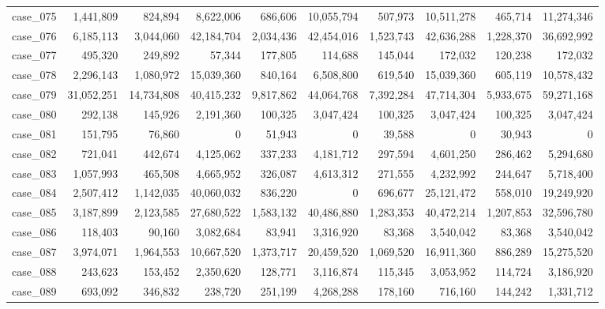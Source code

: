 \begin{footnotesize}
\begin{longtable}{l r rr rr rr rr}
case\_075 & 1{,}441{,}809 & 824{,}894 & 8{,}622{,}006 & 686{,}606 & 10{,}055{,}794 & 507{,}973 & 10{,}511{,}278 & 465{,}714 & 11{,}274{,}346 \\
case\_076 & 6{,}185{,}113 & 3{,}044{,}060 & 42{,}184{,}704 & 2{,}034{,}436 & 42{,}454{,}016 & 1{,}523{,}743 & 42{,}636{,}288 & 1{,}228{,}370 & 36{,}692{,}992 \\
case\_077 & 495{,}320 & 249{,}892 & 57{,}344 & 177{,}805 & 114{,}688 & 145{,}044 & 172{,}032 & 120{,}238 & 172{,}032 \\
case\_078 & 2{,}296{,}143 & 1{,}080{,}972 & 15{,}039{,}360 & 840{,}164 & 6{,}508{,}800 & 619{,}540 & 15{,}039{,}360 & 605{,}119 & 10{,}578{,}432 \\
case\_079 & 31{,}052{,}251 & 14{,}734{,}808 & 40{,}415{,}232 & 9{,}817{,}862 & 44{,}064{,}768 & 7{,}392{,}284 & 47{,}714{,}304 & 5{,}933{,}675 & 59{,}271{,}168 \\
case\_080 & 292{,}138 & 145{,}926 & 2{,}191{,}360 & 100{,}325 & 3{,}047{,}424 & 100{,}325 & 3{,}047{,}424 & 100{,}325 & 3{,}047{,}424 \\
case\_081 & 151{,}795 & 76{,}860 & 0 & 51{,}943 & 0 & 39{,}588 & 0 & 30{,}943 & 0 \\
case\_082 & 721{,}041 & 442{,}674 & 4{,}125{,}062 & 337{,}233 & 4{,}181{,}712 & 297{,}594 & 4{,}601{,}250 & 286{,}462 & 5{,}294{,}680 \\
case\_083 & 1{,}057{,}993 & 465{,}508 & 4{,}665{,}952 & 326{,}087 & 4{,}613{,}312 & 271{,}555 & 4{,}232{,}992 & 244{,}647 & 5{,}718{,}400 \\
case\_084 & 2{,}507{,}412 & 1{,}142{,}035 & 40{,}060{,}032 & 836{,}220 & 0 & 696{,}677 & 25{,}121{,}472 & 558{,}010 & 19{,}249{,}920 \\
case\_085 & 3{,}187{,}899 & 2{,}123{,}585 & 27{,}680{,}522 & 1{,}583{,}132 & 40{,}486{,}880 & 1{,}283{,}353 & 40{,}472{,}214 & 1{,}207{,}853 & 32{,}596{,}780 \\
case\_086 & 118{,}403 & 90{,}160 & 3{,}082{,}684 & 83{,}941 & 3{,}316{,}920 & 83{,}368 & 3{,}540{,}042 & 83{,}368 & 3{,}540{,}042 \\
case\_087 & 3{,}974{,}071 & 1{,}964{,}553 & 10{,}667{,}520 & 1{,}373{,}717 & 20{,}459{,}520 & 1{,}069{,}520 & 16{,}911{,}360 & 886{,}289 & 15{,}275{,}520 \\
case\_088 & 243{,}623 & 153{,}452 & 2{,}350{,}620 & 128{,}771 & 3{,}116{,}874 & 115{,}345 & 3{,}053{,}952 & 114{,}724 & 3{,}186{,}920 \\
case\_089 & 693{,}092 & 346{,}832 & 238{,}720 & 251{,}199 & 4{,}268{,}288 & 178{,}160 & 716{,}160 & 144{,}242 & 1{,}331{,}712 \\

\end{longtable}
\end{footnotesize}
